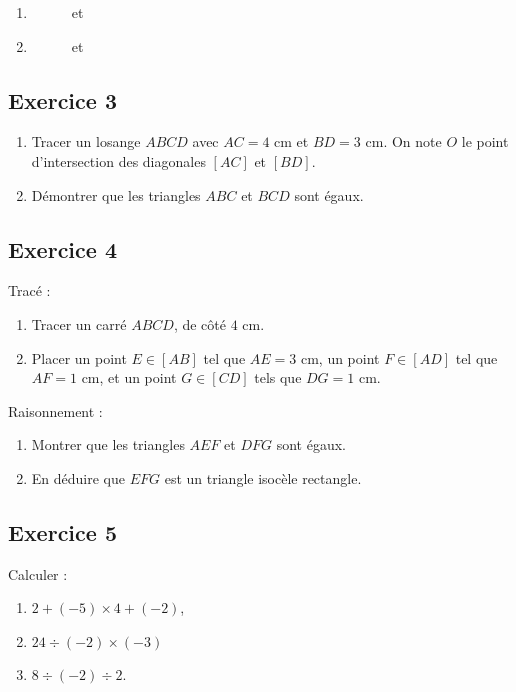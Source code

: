 \documentclass[14 pt]{extarticle}
\theoremstyle{plain}
\begin{document}
\begin{enumerate}
\item
\begin{figure}[H]
\center
 et  \ \ \ \ \ \ \ 
\end{figure}
 \item
\begin{figure}[H]
\center
 et  \ \ \ \ \ \ \ 
\end{figure}
\end{enumerate}

\subsection*{Exercice 3}
 \begin{enumerate}
\item  Tracer un losange $ABCD$ avec $AC=4$ cm et $BD = 3$ cm. On note $O$ le point d'intersection des diagonales $[AC]$ et $[BD]$. \item Démontrer que les triangles $ABC$ et $BCD$ sont égaux. \end{enumerate}
 
\subsection*{Exercice 4}
Tracé : 
\begin{enumerate}

\item Tracer un carré $ABCD$, de côté $4$ cm. 
\item Placer un point $E\in[AB]$ tel que $AE=3$ cm, un point $F\in[AD]$ tel que $AF=1$ cm, et un point $G\in [CD]$ tels que $DG=1$ cm. 
\end{enumerate}
Raisonnement : 
\begin{enumerate}

\item Montrer que les triangles $AEF$ et $DFG$ sont égaux. 

\item En déduire que $EFG$ est un triangle isocèle rectangle. 
\end{enumerate}


\subsection*{Exercice 5}
Calculer : 
\begin{enumerate}
\item $2 + (-5) \times 4 + (-2)$, 
\item $24 \div (-2) \times (-3)$
\item $8 \div (-2) \div 2$. 
\end{enumerate}
 	
\end{document}
